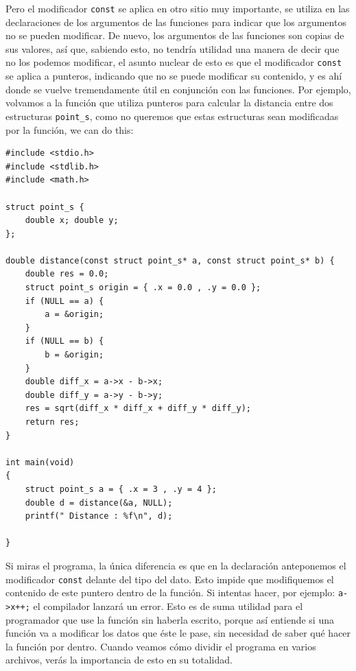 \documentclass[a4paper]{article}
\begin{document}
Pero el modificador \verb!const! se aplica en otro sitio muy importante,
se utiliza en las declaraciones de los argumentos de las funciones para indicar
que los argumentos no se pueden modificar. De nuevo, los argumentos de las
funciones son copias de sus valores, así que, sabiendo esto, no tendría utilidad
una manera de decir que no los podemos modificar, el asunto nuclear de esto es
que el modificador \verb!const! se aplica a punteros, indicando que no se puede
modificar su contenido, y es ahí donde se vuelve tremendamente útil en
conjunción con las funciones. Por ejemplo, volvamos a la función que utiliza
punteros para calcular la distancia entre dos estructuras \verb!point_s!, como
no queremos que estas estructuras sean modificadas por la función, we can do
this:

\noindent
\begin{minipage}[H]{\linewidth}
\mbox{}
\begin{lstlisting}[style=C,
caption={Uso de punteros constantes como argumentos de función},
label={lst:constantArguments}]
#include <stdio.h>
#include <stdlib.h>
#include <math.h>

struct point_s {
    double x; double y;
};

double distance(const struct point_s* a, const struct point_s* b) {
    double res = 0.0;
    struct point_s origin = { .x = 0.0 , .y = 0.0 };
    if (NULL == a) {
        a = &origin;
    }
    if (NULL == b) {
        b = &origin;
    }
    double diff_x = a->x - b->x;
    double diff_y = a->y - b->y;
    res = sqrt(diff_x * diff_x + diff_y * diff_y);
    return res;
}

int main(void)
{
    struct point_s a = { .x = 3 , .y = 4 };
    double d = distance(&a, NULL);
    printf(" Distance : %f\n", d);

}
\end{lstlisting}
\end{minipage}

Si miras el programa, la única diferencia es que en la declaración anteponemos
el modificador \verb!const! delante del tipo del dato. Esto impide que
modifiquemos el contenido de este puntero dentro de la función. Si intentas
hacer, por ejemplo: \verb!a->x++;! el compilador lanzará un error. Esto es de
suma utilidad para el programador que use la función sin haberla escrito,
porque así entiende si una función va a modificar los datos que éste le pase,
sin necesidad de saber qué hacer la función por dentro. Cuando veamos cómo
dividir el programa en varios archivos, verás la importancia de esto en su
totalidad.
\end{document}
